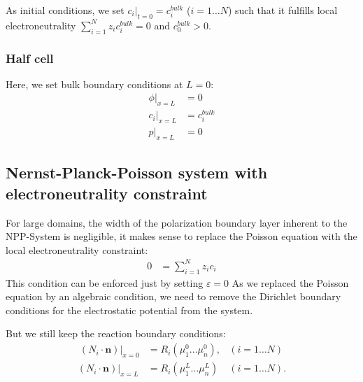 \documentclass[12pt,oneside,reqno]{amsart}
\numberwithin{equation}{section}
\begin{document}
As initial conditions, we set  $c_i|_{t=0}=c_i^{bulk}$ ($i=1\dots N$) such that it fulfills
local electroneutrality $\sum_{i=1}^N z_ic_i^{bulk}=0$ and $c_0^{bulk}>0$.

\subsubsection{Half cell}
Here, we set bulk boundary conditions at $L=0$:
\begin{subequations}
  \begin{align}
    \phi|_{x=L}&=0\\
    c_i|_{x=L}&= c_i^{bulk}\\
    p|_{x=L}&=0
  \end{align}
\end{subequations}

\subsection{Nernst-Planck-Poisson   system    with   electroneutrality constraint} 
For  large  domains, the  width  of  the polarization  boundary  layer
inherent to  the NPP-System is  negligible, it makes sense  to replace
the Poisson equation with the local electroneutrality constraint:
\begin{align}
  0&= \sum_{i=1}^N z_i c_i \label{eq:eneu}
\end{align}
This condition can be enforced just by setting  $\varepsilon=0$
As we replaced the Poisson equation by an algebraic condition, we need to remove 
the Dirichlet boundary conditions for the electrostatic potential from the system.

But we still keep the reaction boundary conditions:
\begin{subequations}\label{sys:NNPbc}
\begin{align}\
  (N_i\cdot \mathbf n)|_{x=0}&=R_i(\mu_1^0\dots\mu_n^0), & (i=1\dots N)\\
  (N_i\cdot \mathbf n)|_{x=L} &=R_i(\mu_1^L\dots\mu_n^L) & (i=1\dots N).
\end{align}
\end{subequations}
\end{document}
